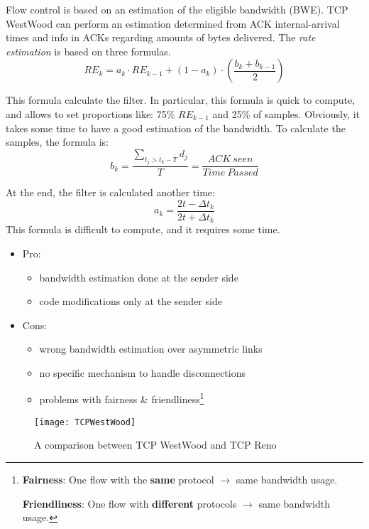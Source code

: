 Flow control is based on an estimation of the eligible bandwidth (BWE). TCP
WestWood can perform an estimation determined from ACK internal-arrival times
and info in ACKs regarding amounts of bytes delivered. The \textit{rate
  estimation} is based on three formulas.
\begin{equation}
  RE_k = a_k \cdot RE_{k-1} + (1 - a_k) \cdot \left( \frac{b_k + b_{k-1}}{2}
\right)
\end{equation}

This formula calculate the filter. In particular, this formula is quick to
compute, and allows to set proportions like: 75\% $RE_{k-1}$ and 25\% of
samples. Obviously, it takes some time to have a good estimation of the
bandwidth.
To calculate the samples, the formula is:
\begin{equation}
b_k = \frac{ \sum_{t_j > t_k-T} d_j }{T} = \frac{ACK\ seen}{Time\ Passed}
\end{equation}

At the end, the filter is calculated another time:
\begin{equation}
a_k = \frac{2t - \Delta t_k}{2t + \Delta t_k}
\end{equation}
This formula is difficult to compute, and it requires some time.
\begin{itemize}
\item Pro:
  \begin{itemize}
    \item bandwidth estimation done at the sender side
    \item code modifications only at the sender side
  \end{itemize}
\item Cons:
  \begin{itemize}
  \item wrong bandwidth estimation over asymmetric links
  \item no specific mechanism to handle disconnections
  \item problems with fairness \& friendliness\footnote{\textbf{Fairness}:
    One flow with the \textbf{same} protocol $\rightarrow$ same
    bandwidth usage.
    
    \textbf{Friendliness}: One flow with \textbf{different} protocols
    $\rightarrow$ same bandwidth usage.}
  \end{itemize}
\end{itemize}

\begin{figure}[h]
\centering
\texttt{[image: TCPWestWood]}
\caption[TCP WestWood vs TCP Reno]{A comparison between TCP WestWood and TCP Reno}
\label{fig:tcpw:tcpwwvstcpr}
\end{figure}
